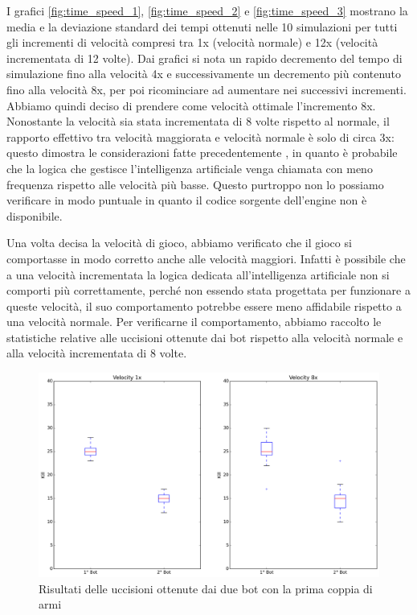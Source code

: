 \documentclass[12pt, italian]{toptesi}
\begin{document}
I grafici  \ref{fig:time_speed_1}, \ref{fig:time_speed_2} e \ref{fig:time_speed_3} mostrano la media e la deviazione standard dei tempi ottenuti nelle 10 simulazioni per tutti gli incrementi di velocità compresi tra 1x (velocità normale) e 12x (velocità incrementata di 12 volte).
Dai grafici si nota un rapido decremento del tempo di simulazione fino alla velocità 4x e successivamente un decremento più contenuto fino alla velocità 8x, per poi ricominciare ad aumentare nei successivi incrementi.
Abbiamo quindi deciso di prendere come velocità ottimale l'incremento 8x. Nonostante la velocità sia stata incrementata di 8 volte rispetto al normale, il rapporto effettivo tra velocità maggiorata e velocità normale è solo di circa 3x: questo dimostra le considerazioni fatte precedentemente , in quanto è probabile che la logica che gestisce l'intelligenza artificiale venga chiamata con meno frequenza rispetto alle velocità più basse. Questo purtroppo non lo possiamo verificare in modo puntuale in quanto il codice sorgente dell'engine non è disponibile.

Una volta decisa la velocità di gioco, abbiamo verificato che il gioco si comportasse in modo corretto anche alle velocità maggiori. Infatti è possibile che a una velocità incrementata la logica dedicata all'intelligenza artificiale non si comporti più correttamente, perché non essendo stata progettata per funzionare a queste velocità, il suo comportamento potrebbe essere meno affidabile rispetto a una velocità normale. 
Per verificarne il comportamento, abbiamo raccolto le statistiche relative alle uccisioni ottenute dai bot rispetto alla velocità normale e alla velocità incrementata di 8 volte.

\begin{figure}[htp]
\centering
\includegraphics[width=1.0\textwidth]{1vs8_1}
\caption{Risultati delle uccisioni ottenute dai due bot con la prima coppia di armi}
\label{fig:kill_vs_speed_1}
\end{figure}
\end{document}
